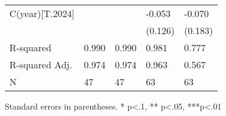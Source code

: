 \begin{table}
\begin{center}
\begin{tabular}{lllll}
C(year)[T.2024]   &                                           &                                                 & -0.053                                  & -0.070                                                 \\
                  &                                           &                                                 & (0.126)                                 & (0.183)                                                \\
R-squared         & 0.990                                     & 0.990                                           & 0.981                                   & 0.777                                                  \\
R-squared Adj.    & 0.974                                     & 0.974                                           & 0.963                                   & 0.567                                                  \\
N                 & 47                                        & 47                                              & 63                                      & 63                                                     \\
\hline
\end{tabular}
\end{center}
\end{table}
\bigskip
Standard errors in parentheses. \newline 
* p<.1, ** p<.05, ***p<.01